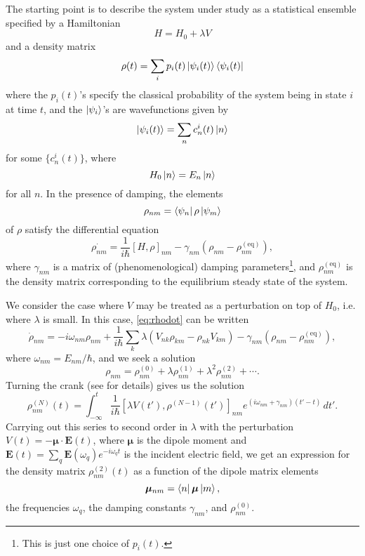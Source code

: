 The starting point is to describe the system under study as a statistical ensemble specified by a Hamiltonian
\begin{equation}
H = H_0+\lambda V
\end{equation}
and a density matrix
\begin{equation}
\rho(t) = \sum_i p_i(t) \ket{\psi_i(t)}\bra{\psi_i(t)}
\end{equation}
where the $p_i(t)$'s specify the classical probability of the system being in state $i$ at time $t$, and the $\ket{\psi_i}$'s are wavefunctions given by
\begin{equation}
\ket{\psi_i(t)} = \sum_n c_n^i(t) \ket{n}
\end{equation}
for some $\{c_n^i(t)\}$, where
\begin{equation}
H_0\ket{n} = E_n \ket{n}
\end{equation}
for all $n$.
In the presence of damping, the elements
\begin{equation}
\rho_{nm} = \bra{\psi_n}\rho\ket{\psi_m}
\end{equation}
of $\rho$ satisfy the differential equation
\begin{equation}\label{eq:rhodot}
\dot{\rho_{nm}} = \frac{1}{i\hbar}[H, \rho]_{nm}-\gamma_{nm}(\rho_{nm}-\rho_{nm}^\mathrm{(eq)}),
\end{equation}
where $\gamma_{nm}$ is a matrix of (phenomenological) damping parameters\footnote{This is just one choice of $p_i(t)$.}, and $\rho_{nm}^\mathrm{(eq)}$ is the density matrix corresponding to the equilibrium steady state of the system.

We consider the case where $V$ may be treated as a perturbation on top of $H_0$, i.e. where $\lambda$ is small.
In this case, \cref{eq:rhodot} can be written
\begin{equation}
\dot{\rho}_{nm} = -i \omega_{nm} \rho_{nm}+\frac{1}{i\hbar}\sum_k \lambda(V_{nk}\rho_{km}-\rho_{nk}V_{km})-\gamma_{nm}(\rho_{nm}-\rho_{nm}^\mathrm{(eq)}),
\end{equation}
where $\omega_{nm}=E_{nm}/\hbar$, and we seek a solution
\begin{equation}
\rho_{nm}=\rho_{nm}^{(0)}+\lambda\rho_{nm}^{(1)}+\lambda^2\rho_{nm}^{(2)}+\cdots.
\end{equation}
Turning the crank (see \citet{boyd} for details) gives us the solution
\begin{equation}
\rho_{nm}^{(N)}(t) = \int_{-\infty}^t \frac{1}{i\hbar}[\lambda V(t'), \rho^{(N-1)}(t')]_{nm}e^{(i\omega_{nm}+\gamma_{nm})(t'-t)} \, dt'.
\end{equation}
Carrying out this series to second order in $\lambda$ with the perturbation $V(t)=-\bm{\mu}\cdot\bm{E}(t)$, where $\bm{\mu}$ is the dipole moment and $\bm{E}(t) = \sum_q\bm{E}(\omega_q)e^{-i\omega_q t}$ is the incident electric field, we get an expression for the density matrix $\rho_{nm}^{(2)}(t)$ as a function of the dipole matrix elements
\begin{equation}
\bm{\mu}_{nm} = \bra{n}\bm{\mu}\ket{m},
\end{equation}
the frequencies $\omega_q$, the damping constants $\gamma_{nm}$, and $\rho_{nm}^{(0)}$.

